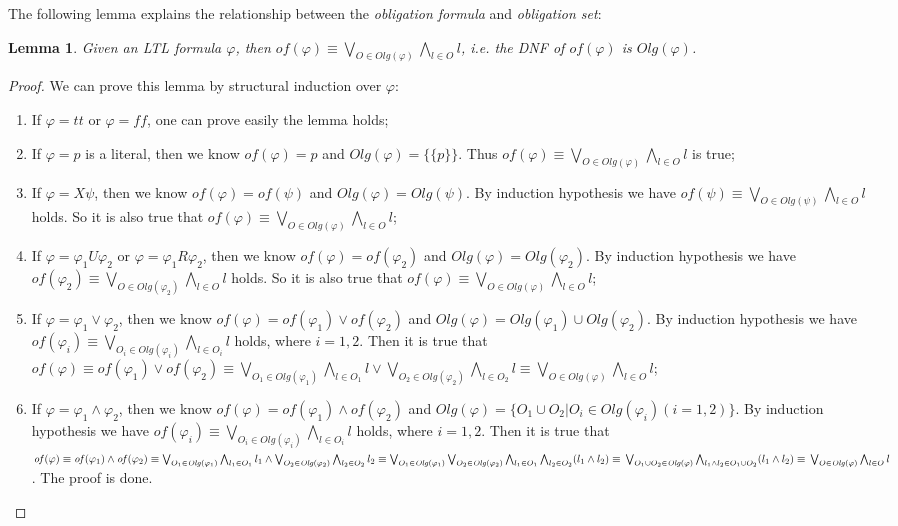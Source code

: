 \documentclass[conference]{IEEEtran}
\newtheorem{lemma}{Lemma}
\newtheorem{proof}{IEEEproof}
\def\olg#1{\mathit{Olg}(#1)}
\def\phi{\varphi}
\def\ff{\mathit{ff}}
\def\tt{\mathit{tt}}
\def\of#1{\mathit{of}(#1)}
\begin{document}
The following lemma explains the relationship between the \textit{obligation formula} and \textit{obligation set}:

\begin{lemma}\label{lemma:ofandos}
  Given an LTL formula $\phi$, then
  $\of{\phi}\equiv\bigvee_{O\in\olg{\phi}}\bigwedge_{l\in O} l$,
  i.e. the DNF of $\of{\phi}$ is
  $\olg{\phi}$.
\end{lemma}
\begin{proof}
  We can prove this lemma by structural induction over $\phi$:
  \begin{enumerate}
    \item If $\phi=\tt$ or $\phi=\ff$, one can prove easily the lemma holds;
    \item If $\phi=p$ is a literal, then we know $\of{\phi}=p$ and $\olg{\phi}=\{\{p\}\}$. Thus 
    $\of{\phi}\equiv\bigvee_{O\in\olg{\phi}}\bigwedge_{l\in O} l$ is true;
    \item If $\phi=X\psi$, then we know $\of{\phi}=\of{\psi}$ and $\olg{\phi}=\olg{\psi}$. By induction 
    hypothesis we have $\of{\psi}\equiv \bigvee_{O\in\olg{\psi}}\bigwedge_{l\in O} l$ holds. So 
    it is also true that $\of{\phi}\equiv \bigvee_{O\in\olg{\phi}}\bigwedge_{l\in O} l$;
    \item If $\phi=\phi_1U\phi_2$ or $\phi=\phi_1R\phi_2$, then we know $\of{\phi}=\of{\phi_2}$ and 
    $\olg{\phi}=\olg{\phi_2}$. By induction hypothesis we have $\of{\phi_2}\equiv \bigvee_{O\in\olg{\phi_2}}\bigwedge_{l\in O} l$ holds. So 
    it is also true that $\of{\phi}\equiv \bigvee_{O\in\olg{\phi}}\bigwedge_{l\in O} l$;
    \item If $\phi=\phi_1\vee\phi_2$, then we know $\of{\phi}=\of{\phi_1}\vee\of{\phi_2}$ and 
    $\olg{\phi}=\olg{\phi_1}\cup \olg{\phi_2}$. By induction hypothesis we have $\of{\phi_i}\equiv 
    \bigvee_{O_i\in\olg{\phi_i}}\bigwedge_{l\in O_i}l$ holds, where $i=1,2$. Then it is true that 
    $\of{\phi}\equiv 
    \of{\phi_1}\vee\of{\phi_2}\equiv\bigvee_{O_1\in\olg{\phi_1}}\bigwedge_{l\in O_1}l \vee \bigvee_{O_2\in\olg{\phi_2}}\bigwedge_{l\in O_2}l \equiv \bigvee_{O\in\olg{\phi}}\bigwedge_{l\in O}l$;
    \item If $\phi=\phi_1\wedge\phi_2$, then we know $\of{\phi}=\of{\phi_1}\wedge\of{\phi_2}$ and 
    $\olg{\phi}=\{O_1\cup O_2| O_i\in\olg{\phi_i}(i=1,2)\}$.  By induction hypothesis we have $\of{\phi_i}\equiv 
    \bigvee_{O_i\in\olg{\phi_i}}\bigwedge_{l\in O_i}l$ holds, where $i=1,2$. Then it is true that 
    $\of{\phi}\equiv 
    \of{\phi_1}\wedge\of{\phi_2}\equiv\bigvee_{O_1\in\olg{\phi_1}}\bigwedge_{l_1\in O_1}l_1 \wedge \bigvee_{O_2\in\olg{\phi_2}}\bigwedge_{l_2\in O_2}l_2 \equiv \bigvee_{O_1\in\olg{\phi_1}}\bigvee_{O_2\in\olg{\phi_2}}\bigwedge_{l_1\in O_1}\bigwedge_{l_2\in O_2}(l_1\wedge l_2)\equiv\\\bigvee_{O_1\cup O_2\in \olg{\phi}}\bigwedge_{l_1\wedge l_2\in O_1\cup O_2}(l_1\wedge l_2)\equiv \\\bigvee_{O\in\olg{\phi}}\bigwedge_{l\in O}l$. The proof is done.
  \end{enumerate}
\end{proof}
\end{document}
